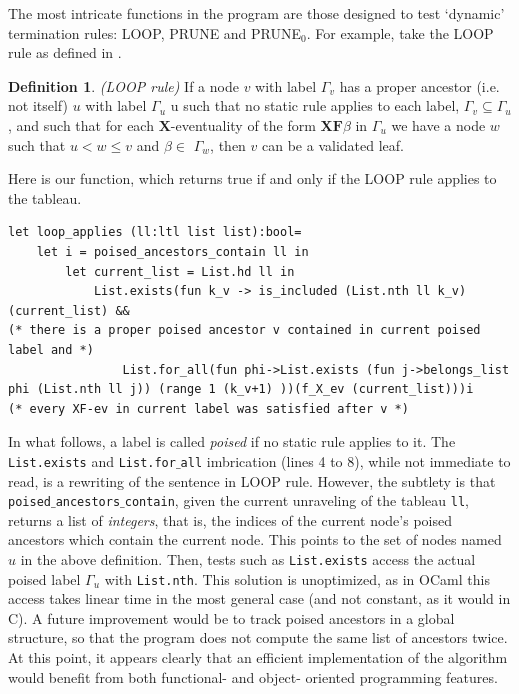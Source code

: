 \documentclass[11pt]{article}
\newcommand{\X}{{\mathbf{X}}}
\newcommand{\F}{{\mathbf{F}}}
\theoremstyle{definition}
\newtheorem{definition}{Definition}
\begin{document}
The most intricate functions in the program are those designed to test `dynamic'
termination rules: LOOP, PRUNE and PRUNE$_0$. For example, take the LOOP rule as defined in 
\cite{ReyLTL}. 
\begin{definition}
    \emph{(LOOP rule)}
    If a node $v$ with label $\Gamma_v$ has a proper ancestor (i.e. not itself) $u$ with label $\Gamma_u$ u 
    such that no static rule applies to each label, $\Gamma_v \subseteq \Gamma_u$,
    and such that for each $\X$-eventuality of the form $\X\F\beta$ in $\Gamma_u$ we
    have a node $w$ such that $u < w \leq v $ and $\beta \in$ $\Gamma_w$, then $v$ can be a validated leaf.
\end{definition}
Here is our function, which returns true if and only if the LOOP rule
applies to the tableau.
\begin{lstlisting}
let loop_applies (ll:ltl list list):bool=
    let i = poised_ancestors_contain ll in
        let current_list = List.hd ll in
            List.exists(fun k_v -> is_included (List.nth ll k_v)(current_list) &&
(* there is a proper poised ancestor v contained in current poised label and *)
                List.for_all(fun phi->List.exists (fun j->belongs_list phi (List.nth ll j)) (range 1 (k_v+1) ))(f_X_ev (current_list)))i
(* every XF-ev in current label was satisfied after v *)
\end{lstlisting}

In what follows, a label is called \emph{poised} if no static rule applies to it.
The {\tt List.exists} and {\tt List.for$\_$all} imbrication (lines 4 to 8), while not immediate to read, is a rewriting 
of the sentence in LOOP rule. However, the subtlety is that {\tt poised$\_$ancestors$\_$contain}, given the current unraveling
of the tableau {\tt ll}, returns a list of \emph{integers}, that is, the indices of the current node's poised ancestors
which contain the current node. This points to the set of nodes named $u$ in the above definition. Then, tests such as 
{\tt List.exists} access the actual poised label $\Gamma_u$ with {\tt List.nth}. This solution is unoptimized, as in OCaml 
this access takes linear time in the most general case (and not constant, as it would in C). 
A future improvement would be to track poised ancestors in a global structure,
so that the program does not compute the same list of ancestors twice. At this point, it appears clearly that 
an efficient implementation of
the algorithm would benefit from both functional- and object- oriented programming features. 
\end{document}
